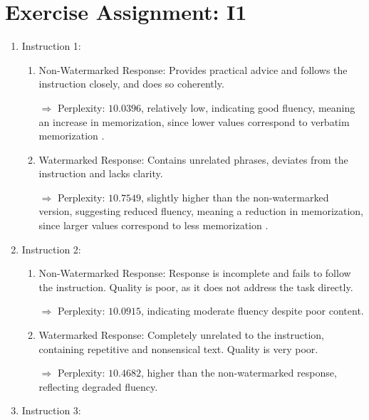 \documentclass{article}
\begin{document}
\clearpage 

\section{Exercise Assignment: I1}\label{sec:i1}
\begin{enumerate}
    \item Instruction 1:
          \begin{enumerate}
              \item Non-Watermarked Response: Provides practical advice and follows the instruction closely, and does so coherently.

                    $\Rightarrow$ Perplexity: \( 10.0396 \), relatively low, indicating good fluency, meaning an increase in memorization, since lower values correspond to verbatim memorization \cite{panaitesculiess2024watermarkinglargelanguagemodels}.

              \item Watermarked Response: Contains unrelated phrases, deviates from the instruction and lacks clarity.

                    $\Rightarrow$ Perplexity: \( 10.7549 \), slightly higher than the non-watermarked version, suggesting reduced fluency, meaning a reduction in memorization, since larger values correspond to less memorization \cite{panaitesculiess2024watermarkinglargelanguagemodels}.

          \end{enumerate}

    \item Instruction 2:
          \begin{enumerate}
              \item Non-Watermarked Response: Response is incomplete and fails to follow the instruction. Quality is poor, as it does not address the task directly.

                    $\Rightarrow$ Perplexity: \( 10.0915 \), indicating moderate fluency despite poor content.

              \item Watermarked Response: Completely unrelated to the instruction, containing repetitive and nonsensical text. Quality is very poor.

                    $\Rightarrow$ Perplexity: \( 10.4682 \), higher than the non-watermarked response, reflecting degraded fluency.
          \end{enumerate}

    \item Instruction 3:
          \begin{enumerate}


\end{enumerate}
\end{enumerate}
\end{document}
